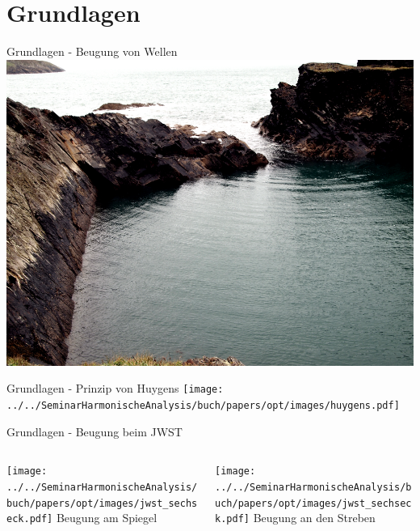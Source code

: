 \section{Grundlagen}

\begin{frame}{Grundlagen - Beugung von Wellen}
    \centering
    \includegraphics[height=0.9\textheight]{images/beugung_von_wasserwellen.png}
\end{frame}

\begin{frame}{Grundlagen - Prinzip von Huygens}
    \texttt{[image: ../../SeminarHarmonischeAnalysis/buch/papers/opt/images/huygens.pdf]}
\end{frame}

\begin{frame}{Grundlagen - Beugung beim JWST}
    \begin{columns}
        \begin{column}{0.4\textwidth}
            \centering
            \texttt{[image: ../../SeminarHarmonischeAnalysis/buch/papers/opt/images/jwst\_sechseck.pdf]}
            Beugung am Spiegel
        \end{column}
        \pause
        \begin{column}{0.4\textwidth}
            \centering
            \texttt{[image: ../../SeminarHarmonischeAnalysis/buch/papers/opt/images/jwst\_sechseck.pdf]}
            Beugung an den Streben
        \end{column}
    \end{columns}
\end{frame}

